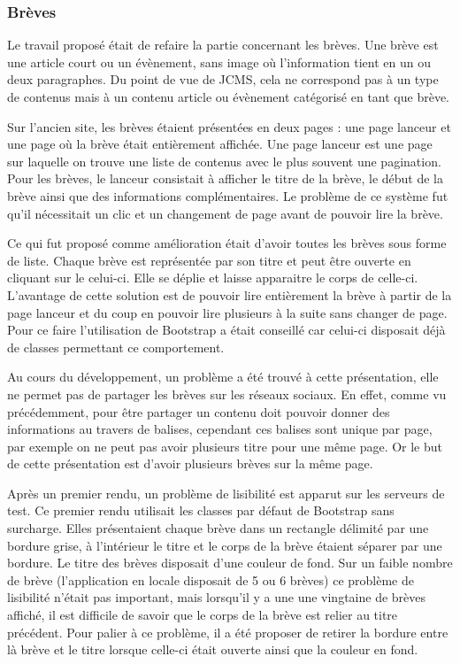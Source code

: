 \documentclass[12pt,a4paper]{article}
\begin{document}
\subsubsection{Brèves}
Le travail proposé était de refaire la partie concernant les brèves. Une brève est une article court ou un évènement, sans image où l'information tient en un ou deux paragraphes. Du point de vue de \gls{JCMS}, cela ne correspond pas à un type de contenus mais à un contenu article ou évènement catégorisé en tant que brève.\par
\medskip
Sur l'ancien site, les brèves étaient présentées en deux pages : une page lanceur et une page où la brève était entièrement affichée. Une page lanceur est une page sur laquelle on trouve une liste de contenus avec le plus souvent une pagination. Pour les brèves, le lanceur consistait à afficher le titre de la brève, le début de la brève ainsi que des informations complémentaires. Le problème de ce système fut qu'il nécessitait un clic et un changement de page avant de pouvoir lire la brève.\par
Ce qui fut proposé comme amélioration était d'avoir toutes les brèves sous forme de liste. Chaque brève est représentée par son titre et peut être ouverte en cliquant sur le celui-ci. Elle se déplie et laisse apparaitre le corps de celle-ci. L'avantage de cette solution est de pouvoir lire entièrement la brève à partir de la page lanceur et du coup en pouvoir lire plusieurs à la suite sans changer de page. Pour ce faire l'utilisation de Bootstrap a était conseillé car celui-ci disposait déjà de classes permettant ce comportement.\par
\medskip
Au cours du développement, un problème a été trouvé à cette présentation, elle ne permet pas de partager les brèves sur les réseaux sociaux. En effet, comme vu précédemment, pour être partager un contenu doit pouvoir donner des informations au travers de balises, cependant ces balises sont unique par page, par exemple on ne peut pas avoir plusieurs titre pour une même page. Or le but de cette présentation est d'avoir plusieurs brèves sur la même page.\par
Après un premier rendu, un problème de lisibilité est apparut sur les serveurs de test. Ce premier rendu utilisait les classes par défaut de Bootstrap sans surcharge. Elles présentaient chaque brève dans un rectangle délimité par une bordure grise, à l'intérieur le titre et le corps de la brève étaient séparer par une bordure. Le titre des brèves disposait d'une couleur de fond. Sur un faible nombre de brève (l'application en locale disposait de 5 ou 6 brèves) ce problème de lisibilité n'était pas important, mais lorsqu'il y a une une vingtaine de brèves affiché, il est difficile de savoir que le corps de la brève est relier au titre précédent. Pour palier à ce problème, il a été proposer de retirer la bordure entre là brève et le titre lorsque celle-ci était ouverte ainsi que la couleur en fond.\par
\end{document}
